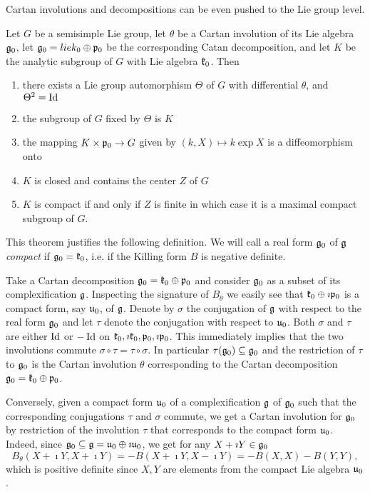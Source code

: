 Cartan involutions and decompositions can be even pushed to the Lie group level.
\begin{theorem}
 Let $G$ be a semisimple Lie group, let $\theta$ be a Cartan involution of its Lie algebra $\mathfrak{g}_0$, let $\mathfrak{g}_0 = lie{k}_0 \oplus \mathfrak{p}_0$ be the corresponding Catan decomposition, and let $K$ be the analytic subgroup of $G$ with Lie algebra $\mathfrak{k}_0$. Then
 \begin{enumerate}
  \item there exists a Lie group automorphism $\Theta$ of $G$ with differential $\theta$, and $\Theta^2=\operatorname{\mathrm{Id}}$
  \item the subgroup of $G$ fixed by $\Theta$ is $K$
  \item the mapping $K\times \mathfrak{p}_0 \to G$ given by $(k,X)\mapsto k \exp{X}$ is a diffeomorphism onto
  \item $K$ is closed and contains the center $Z$ of $G$
  \item $K$ is compact if and only if $Z$ is finite in which case it is a maximal compact subgroup of $G$.
 \end{enumerate}
\end{theorem}

This theorem justifies the following definition. We will call a real form $\mathfrak{g}_0$ of $\mathfrak{g}$ \emph{compact} if $\mathfrak{g}_0 = \mathfrak{k}_0$, i.e. if the Killing form $B$ is negative definite.

Take a Cartan decomposition $\mathfrak{g}_0 = \mathfrak{k}_0 \oplus \mathfrak{p}_0$ and consider $\mathfrak{g}_0$ as a subset of its complexification $\mathfrak{g}$. Inspecting the signature of $B_\theta$ we easily see that $\mathfrak{k}_0\oplus \imath \mathfrak{p}_0$ is a compact form, say $\mathfrak{u}_0$, of $\mathfrak{g}$. Denote by $\sigma$ the conjugation of $\mathfrak{g}$ with respect to the real form $\mathfrak{g}_0$ and let $\tau$ denote the conjugation with respect to $\mathfrak{u}_0$. Both $\sigma$ and $\tau$ are either $\operatorname{\mathrm{Id}}$ or $-\operatorname{\mathrm{Id}}$ on $\mathfrak{k}_0, \imath \mathfrak{k}_0, \mathfrak{p}_0, \imath \mathfrak{p}_0$. This immediately implies that the two involutions commute $\sigma \circ \tau = \tau \circ \sigma$. In particular $\tau (\mathfrak{g}_0) \subseteq \mathfrak{g}_0$ and the restriction of $\tau$ to $\mathfrak{g}_0$ is the Cartan involution $\theta$ corresponding to the Cartan decomposition $\mathfrak{g}_0=\mathfrak{k}_0 \oplus \mathfrak{p}_0$.

Conversely, given a compact form $\mathfrak{u}_0$ of a complexification $\mathfrak{g}$ of $\mathfrak{g}_0$ such that the corresponding conjugations $\tau$ and $\sigma$ commute, we get a Cartan involution for $\mathfrak{g}_0$ by restriction of the involution $\tau$ that corresponds to the compact form $\mathfrak{u}_0$. Indeed, since $\mathfrak{g}_0 \subseteq \mathfrak{g} = \mathfrak{u}_0 \oplus \imath \mathfrak{u}_0$, we get for any $X+\imath Y\in\mathfrak{g}_0$
\[
 B_\theta (X+\imath Y,X+\imath Y) = -B(X+\imath Y,X-\imath Y) = -B(X,X) - B(Y,Y),
\]
which is positive definite since $X,Y$ are elements from the compact Lie algebra $\mathfrak{u}_0$.


